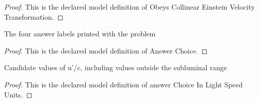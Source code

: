 \begin{proof}
  This is the declared model definition of Obeys Collinear Einstein Velocity Transformation.
\end{proof}
\begin{definition}
  \label{def:physics:phyx-mini-0595:phyxminiproblems-problemphyxmini0595-answerchoice}
  The four answer labels printed with the problem
\end{definition}
\begin{proof}
  This is the declared model definition of Answer Choice.
\end{proof}
\begin{definition}
  \label{def:physics:phyx-mini-0595:phyxminiproblems-problemphyxmini0595-answerchoiceinlightspeedunits}
  Candidate values of u'/c, including values outside the subluminal range
\end{definition}
\begin{proof}
  This is the declared model definition of answer Choice In Light Speed Units.
\end{proof}
